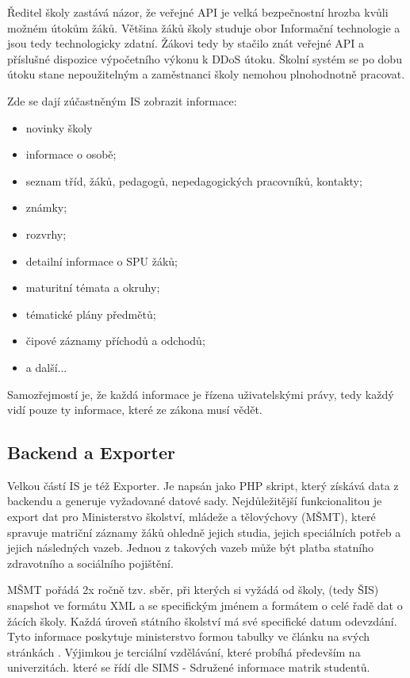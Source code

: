 \documentclass[FM,Proj]{tulthesis}
\begin{document}
Ředitel školy zastává názor, že veřejné API je velká bezpečnostní hrozba kvůli možném útokům
žáků. Většina žáků školy studuje obor Informační technologie a jsou tedy technologicky zdatní.
Žákovi tedy by stačilo znát veřejné API a příslušné dispozice výpočetního výkonu k DDoS útoku.
Školní systém se po dobu útoku stane nepoužitelným a zaměstnanci školy nemohou plnohodnotně
pracovat.

Zde se dají zúčastněným IS zobrazit informace:
\begin{itemize}
    \item novinky školy
    \item informace o osobě;
    \item seznam tříd, žáků, pedagogů, nepedagogických pracovníků, kontakty;
    \item známky;
    \item rozvrhy;
    \item detailní informace o SPU žáků;
    \item maturitní témata a okruhy;
    \item tématické plány předmětů;
    \item čipové záznamy příchodů a odchodů;
    \item a další...


\end{itemize}
Samozřejmostí je, že každá informace je řízena uživatelskými právy, tedy každý vidí pouze ty
informace, které ze zákona musí vědět.

\subsection*{Backend a Exporter}
Velkou částí IS je též Exporter. Je napsán jako PHP skript, který získává data z backendu a generuje
vyžadované datové sady. Nejdůležitější funkcionalitou je export dat pro Ministerstvo školství, mládeže 
a tělovýchovy (MŠMT), které spravuje matriční záznamy žáků ohledně jejich studia, jejich speciálních
potřeb a jejich následných vazeb. Jednou z takových vazeb může být platba statního zdravotního a 
sociálního pojištění.

MŠMT pořádá 2x ročně tzv. sběr\cite{skolni-matrika}, při kterých si vyžádá od školy,
(tedy ŠIS) snapshot ve formátu XML a se specifickým jménem a formátem o celé řadě 
dat o žácích školy. Každá úroveň státního školství má své specifické datum odevzdání.
Tyto informace poskytuje ministerstvo formou tabulky ve článku na svých stránkách
\cite{msmt-terminy-predavani-dat-2023}. Výjimkou je terciální vzdělávání, které probíhá
především na univerzitách. které se řídí dle SIMS - Sdružené informace matrik studentů.
\end{document}

